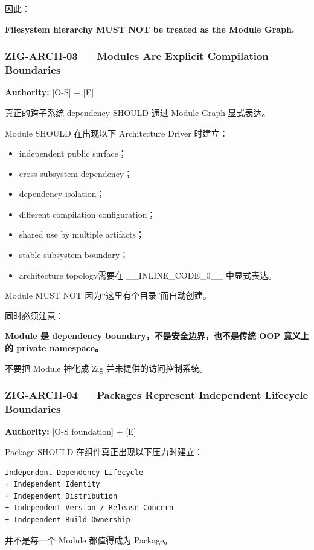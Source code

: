 \documentclass[11pt,a4paper]{article}
\begin{document}
因此：

\begin{gfmBlockquote}
\textbf{Filesystem hierarchy MUST NOT be treated as the Module Graph.}
\end{gfmBlockquote}
\subsubsection{ZIG-ARCH-03 — Modules Are Explicit Compilation Boundaries}
\textbf{Authority:} [O-S] + [E]

真正的跨子系统 dependency SHOULD 通过 Module Graph 显式表达。

Module SHOULD 在出现以下 Architecture Driver 时建立：

\begin{itemize}
  \item independent public surface；
  \item cross-subsystem dependency；
  \item dependency isolation；
  \item different compilation configuration；
  \item shared use by multiple artifacts；
  \item stable subsystem boundary；
  \item architecture topology需要在 \_\_INLINE\_CODE\_0\_\_ 中显式表达。
\end{itemize}
Module MUST NOT 因为“这里有个目录”而自动创建。

同时必须注意：

\begin{gfmBlockquote}
\textbf{Module 是 dependency boundary，不是安全边界，也不是传统 OOP 意义上的 private namespace。}
\end{gfmBlockquote}
不要把 Module 神化成 Zig 并未提供的访问控制系统。

\subsubsection{ZIG-ARCH-04 — Packages Represent Independent Lifecycle Boundaries}
\textbf{Authority:} [O-S foundation] + [E]

Package SHOULD 在组件真正出现以下压力时建立：

\begin{lstlisting}[language=text]
Independent Dependency Lifecycle
+ Independent Identity
+ Independent Distribution
+ Independent Version / Release Concern
+ Independent Build Ownership
\end{lstlisting}
并不是每一个 Module 都值得成为 Package。
\end{document}
